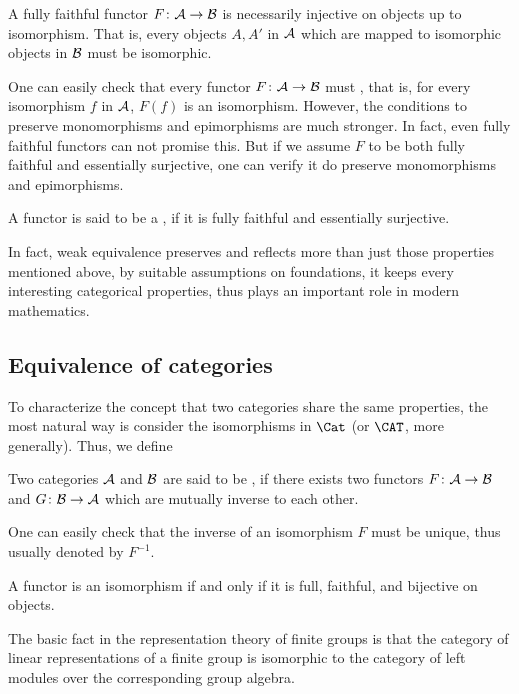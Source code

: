   \begin{cor}
    A fully faithful functor $F\colon{\cal A}\to{\cal B}$ is necessarily injective on objects up to isomorphism. That is, every objects $A,A'$ in ${\cal A}$ which are mapped to isomorphic objects in ${\cal B}$ must be isomorphic.
  \end{cor}

  One can easily check that every functor $F\colon{\cal A}\to{\cal B}$ must , that is, for every isomorphism $f$ in ${\cal A}$, $F(f)$ is an isomorphism.
  However, the conditions to preserve monomorphisms and epimorphisms are much stronger. In fact, even fully faithful functors can not promise this.
  But if we assume $F$ to be both fully faithful and essentially surjective, one can verify it do preserve monomorphisms and epimorphisms.
  \begin{defn}
    A functor is said to be a , if it is fully faithful and essentially surjective.
  \end{defn}

  In fact, weak equivalence preserves and reflects more than just those properties mentioned above, by suitable assumptions on foundations, it keeps every interesting categorical properties, thus plays an important role in modern mathematics.

\subsection{Equivalence of categories}
  To characterize the concept that two categories share the same properties, the most natural way is consider the isomorphisms in $\Cat$ (or $\CAT$, more generally). Thus, we define
  \begin{defn}
    Two categories ${\cal A}$ and ${\cal B}$ are said to be , if there exists two functors $F\colon{\cal A}\to{\cal B}$ and $G\colon{\cal B}\to{\cal A}$ which are mutually inverse to each other.
  \end{defn}
  One can easily check that the inverse of an isomorphism $F$ must be unique, thus usually denoted by $F^{-1}$.

  \begin{prop}
    A functor is an isomorphism if and only if it is full, faithful, and bijective on objects.
  \end{prop}

  \begin{exam}
  The basic fact in the representation theory of finite groups is that the category of linear representations of a finite group is isomorphic to the category of left modules over the corresponding group algebra.
  \end{exam}

